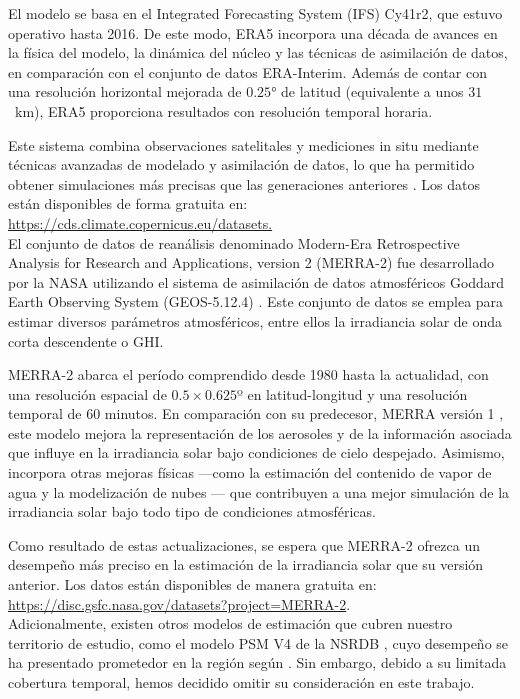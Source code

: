 El modelo se basa en el Integrated Forecasting System (IFS) Cy41r2, que estuvo operativo hasta 2016. De este modo, ERA5 incorpora una década de avances en la física del modelo, la dinámica del núcleo y las técnicas de asimilación de datos, en comparación con el conjunto de datos ERA-Interim. Además de contar con una resolución horizontal mejorada de $0.25$° de latitud (equivalente a unos $31$~km), ERA5 proporciona resultados con resolución temporal horaria. 

Este sistema combina observaciones satelitales y mediciones in situ mediante técnicas avanzadas de modelado y asimilación de datos, lo que ha permitido obtener simulaciones más precisas que las generaciones anteriores \citep{era, nogueira}. Los datos están disponibles de forma gratuita en: \url{https://cds.climate.copernicus.eu/datasets.}\\



El conjunto de datos de reanálisis denominado Modern-Era Retrospective Analysis for Research and Applications, version 2 (MERRA-2) \citep{gelaro} fue desarrollado por la NASA utilizando el sistema de asimilación de datos atmosféricos Goddard Earth Observing System (GEOS-5.12.4) \citep{rienecker, molod}. Este conjunto de datos se emplea para estimar diversos parámetros atmosféricos, entre ellos la irradiancia solar de onda corta descendente o GHI. 

MERRA-2 abarca el período comprendido desde 1980 hasta la actualidad, con una resolución espacial de $0.5\times0.625$º en latitud-longitud y una resolución temporal de 60 minutos. En comparación con su predecesor, MERRA versión 1 \citep{rienecker2}, este modelo mejora la representación de los aerosoles y de la información asociada que influye en la irradiancia solar bajo condiciones de cielo despejado. Asimismo, incorpora otras mejoras físicas —como la estimación del contenido de vapor de agua y la modelización de nubes \citep{feng}— que contribuyen a una mejor simulación de la irradiancia solar bajo todo tipo de condiciones atmosféricas. 

Como resultado de estas actualizaciones, se espera que MERRA-2 ofrezca un desempeño más preciso en la estimación de la irradiancia solar que su versión anterior. Los datos están disponibles de manera gratuita en: \url{https://disc.gsfc.nasa.gov/datasets?project=MERRA-2}.\\



Adicionalmente, existen otros modelos de estimación que cubren nuestro territorio de estudio, como el modelo PSM V4 de la NSRDB \citep{Sengupta2014}, cuyo desempeño 	se ha presentado prometedor en la región según \citep{Salazar2024,Ledesma2025}. Sin embargo, debido a su limitada cobertura temporal, hemos decidido omitir su consideración en este trabajo.\\


